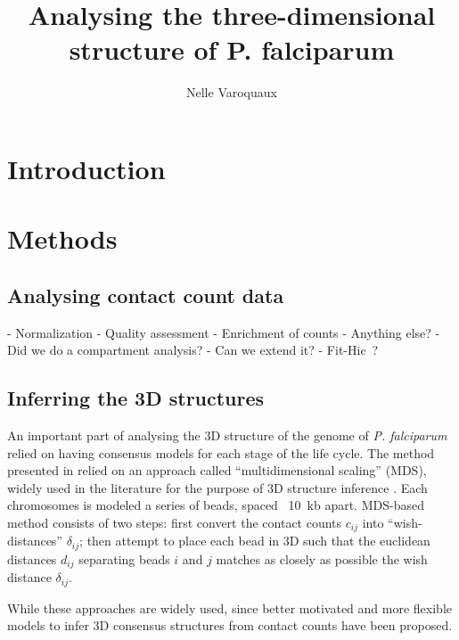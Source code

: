 \documentclass[letterpaper,12pt]{article}
\begin{document}
\title{Analysing the three-dimensional structure of P. falciparum}
\author{Nelle Varoquaux}



\begin{abstract}

\end{abstract}


\section{Introduction}
\label{sec1}


\section{Methods}
\label{sec2}


\subsection{Analysing contact count data}

- Normalization
- Quality assessment
- Enrichment of counts
- Anything else?
    - Did we do a compartment analysis?
- Can we extend it?
  - Fit-Hic ?

\subsection{Inferring the 3D structures}

An important part of analysing the 3D structure of the genome of \textit{P.
falciparum} relied on having consensus models for each stage of the life
cycle. The method presented in \citet{ay:three-dimensional} relied on an
approach called ``multidimensional scaling'' (MDS), widely used in the
literature for the purpose of 3D structure inference
\citep{duan:three-dimensional, varoquaux:statistical, bau:, tanizawa:}. Each chromosomes is
modeled a series of beads, spaced ~10~kb apart. MDS-based method consists of
two steps: first convert the
contact counts $c_{ij}$ into ``wish-distances'' $\delta_{ij}$; then attempt
to place each bead in 3D such that the euclidean distances $d_{ij}$ separating
beads $i$ and $j$ matches as closely as possible the wish distance
$\delta_{ij}$.

While these approaches are widely used, since better motivated and more
flexible models to infer 3D consensus structures from contact counts have been
proposed. 
\end{document}
